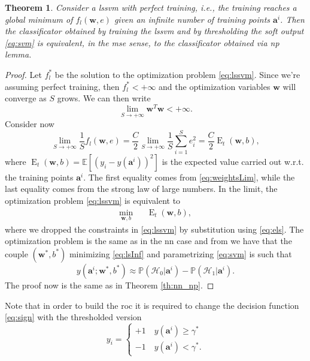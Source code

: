 \documentclass[draftcls,onecolumn,12pt]{IEEEtran}
\newcommand{\ie}{i.e., }
\newcommand{\wrt}{w.r.t. }
\newcommand{\Exp}[1]{\mathbb{E}\left[#1\right]}
\DeclareMathOperator{\E}{E}
\newtheorem{theorem}{Theorem}
\begin{document}
\begin{theorem}
\label{th:lsnp}
Consider a \ac{lssvm} with perfect training, \ie the training reaches a global minimum of $f_l(\mathbf{w},e)$ given an infinite number of training points $\bm{a}^i$. Then the classificator obtained by training the \ac{lssvm} and by thresholding the soft output \eqref{eq:svm} is equivalent, in the \ac{mse} sense, to the classificator obtained via \ac{np} lemma.
\end{theorem}
\begin{proof}
Let $f_l^*$ be the solution to the optimization problem \eqref{eq:lssvm}. Since we're assuming perfect training, then $f_l^* < +\infty$ and the optimization variables $\mathbf{w}$ will converge as $S$ grows. We can then write
\begin{equation}
\label{eq:weightsLim}
			\lim_{S \to +\infty} \mathbf{w}^T \mathbf{w} < +\infty.	
\end{equation}
Consider now
\begin{equation}
	\lim_{S \to +\infty} \frac{1}{S} f_l(\mathbf{w},e) =\frac{C}{2} \lim_{S \to +\infty}\frac{1}{S}  \sum_{i=1}^S e^2_i	=\frac{C}{2}\E_t(\mathbf{w},b),
\end{equation}
where $\E_t(\mathbf{w},b) = \Exp{\left(y_i - y(\mathbf{a}^i)\right)^2} $ is the expected value carried out \wrt the training points $\mathbf{a}^i$. 
The first equality comes from \eqref{eq:weightsLim}, while the last equality comes from the strong law of large numbers. In the limit, the optimization problem \eqref{eq:lssvm} is equivalent to
\begin{equation}
\label{eq:lsInf}
	\begin{aligned}
	& \underset{\mathbf{w},b}{\text{min}} & &  \E_t(\mathbf{w},b), & 
	\end{aligned}	
\end{equation}
where we dropped the constraints in \eqref{eq:lssvm} by substitution using \eqref{eq:els}. The optimization problem is the same as in the \ac{nn} case and from \cite{Ruck-90} we have that the couple $(\mathbf{w}^*,b^*)$ minimizing \eqref{eq:lsInf} and parametrizing \eqref{eq:svm} is such that
\begin{equation}
	 y(\mathbf{a}^i;\mathbf{w}^*,b^*)  \approx \mathbb{P}(\mathcal{H}_0|\mathbf{a}^i) - \mathbb{P}(\mathcal{H}_1|\mathbf{a}^i).
\end{equation}
The proof now is the same as in Theorem \ref{th:nn_np}.
\end{proof}
Note that in order to build the \ac{roc} it is required to change the decision function \eqref{eq:sign} with the thresholded version
\begin{equation}
y_i = 
\begin{cases}
 +1 \quad y(\mathbf{a}^i)  \geq \gamma^* \\
 -1 \quad y(\mathbf{a}^i)  < \gamma^*.
\end{cases}		
\end{equation}
\end{document}
